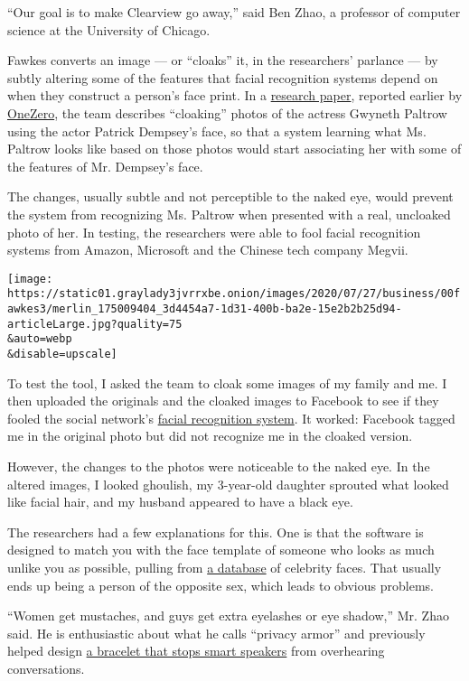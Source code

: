 ``Our goal is to make Clearview go away,'' said Ben Zhao, a professor of
computer science at the University of Chicago.

Fawkes converts an image --- or ``cloaks'' it, in the researchers'
parlance --- by subtly altering some of the features that facial
recognition systems depend on when they construct a person's face print.
In a \href{https://arxiv.org/pdf/2002.08327.pdf}{research paper},
reported earlier by
\href{https://onezero.medium.com/this-filter-makes-your-photos-invisible-to-facial-recognition-a26929b5ccf}{OneZero},
the team describes ``cloaking'' photos of the actress Gwyneth Paltrow
using the actor Patrick Dempsey's face, so that a system learning what
Ms. Paltrow looks like based on those photos would start associating her
with some of the features of Mr. Dempsey's face.

The changes, usually subtle and not perceptible to the naked eye, would
prevent the system from recognizing Ms. Paltrow when presented with a
real, uncloaked photo of her. In testing, the researchers were able to
fool facial recognition systems from Amazon, Microsoft and the Chinese
tech company Megvii.

\texttt{[image: https://static01.graylady3jvrrxbe.onion/images/2020/07/27/business/00fawkes3/merlin\_175009404\_3d4454a7-1d31-400b-ba2e-15e2b2b25d94-articleLarge.jpg?quality=75\\\&auto=webp\\\&disable=upscale]}

To test the tool, I asked the team to cloak some images of my family and
me. I then uploaded the originals and the cloaked images to Facebook to
see if they fooled the social network's
\href{https://www.facebookcorewwwi.onion/help/122175507864081}{facial
recognition system}. It worked: Facebook tagged me in the original photo
but did not recognize me in the cloaked version.

However, the changes to the photos were noticeable to the naked eye. In
the altered images, I looked ghoulish, my 3-year-old daughter sprouted
what looked like facial hair, and my husband appeared to have a black
eye.

The researchers had a few explanations for this. One is that the
software is designed to match you with the face template of someone who
looks as much unlike you as possible, pulling from
\href{http://www.robots.ox.ac.uk/~vgg/data/vgg_face2/}{a database} of
celebrity faces. That usually ends up being a person of the opposite
sex, which leads to obvious problems.

``Women get mustaches, and guys get extra eyelashes or eye shadow,'' Mr.
Zhao said. He is enthusiastic about what he calls ``privacy armor'' and
previously helped design
\href{https://www.nytimes3xbfgragh.onion/2020/02/14/technology/alexa-jamming-bracelet-privacy-armor.html}{a
bracelet that stops smart speakers} from overhearing conversations.

